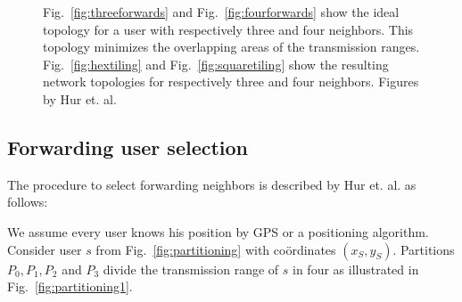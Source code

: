 \begin{figure}
\caption{\label{fig:forwarding}Fig.~\ref{fig:threeforwards} and Fig.~\ref{fig:fourforwards} show the ideal topology for a user with respectively three and four neighbors. This topology minimizes the overlapping areas of the transmission ranges. Fig.~\ref{fig:hextiling} and Fig.~\ref{fig:squaretiling} show the resulting network topologies for respectively three and four neighbors. Figures by Hur et. al. \cite{dtc2} }
\end{figure}

\subsection{Forwarding user selection}\label{subsec:forwardingSel}

The procedure to select forwarding neighbors is described by Hur et. al. \cite{dtc2} as follows:

We assume every user knows his position by GPS or a positioning algorithm. Consider user $s$ from Fig.~\ref{fig:partitioning} with co\"ordinates $(x_S,y_S)$. Partitions $P_0,P_1,P_2$ and $P_3$ divide the transmission range of $s$ in four as illustrated in Fig.~\ref{fig:partitioning1}. 

